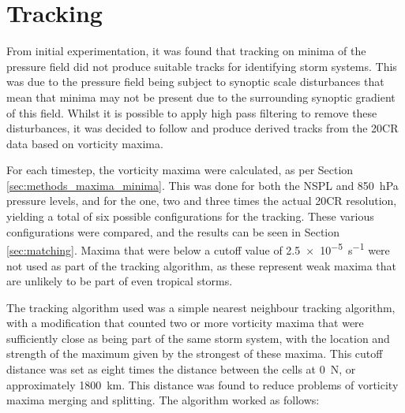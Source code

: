 \documentclass[pdftex,12pt,a4paper]{report}
\begin{document}
\section{Tracking}
\label{sec:tracking}

From initial experimentation, it was found that tracking on minima of the pressure field did not
produce suitable tracks for identifying storm systems. This was due to the pressure field being
subject to synoptic scale disturbances that mean that minima may not be present due to the
surrounding synoptic gradient of this field. Whilst it is possible to apply high pass filtering to
remove these disturbances, it was decided to follow \textcite{reed1988evaluation,
thorncroft2001african} and produce derived tracks from the 20CR data based on vorticity maxima.

For each timestep, the vorticity maxima were calculated, as per Section
\ref{sec:methods_maxima_minima}. This was done for both the NSPL and \SI{850}{hPa} pressure
levels, and for the one, two and three times the actual 20CR resolution, yielding a total of six
possible configurations for the tracking. These various configurations were compared, and the
results can be seen in Section \ref{sec:matching}. Maxima that were below a cutoff value
of \SI{2.5e-5}{s^{-1}} were not used as part of the tracking algorithm, as these represent weak maxima
that are unlikely to be part of even tropical storms. 


The tracking algorithm used was a simple nearest neighbour tracking algorithm, with a modification
that counted two or more vorticity maxima that were sufficiently close as being part of the same storm
system, with the location and strength of the maximum given by the strongest of
these maxima. This cutoff distance was set as eight times the distance between the cells at
0\textdegree\ N, or approximately \SI{1800}{km}. This distance was found to reduce problems of
vorticity maxima merging and splitting. The algorithm worked as follows:
\end{document}
